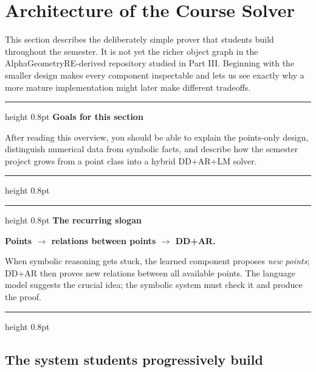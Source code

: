 \documentclass[reqno]{amsart}
\newenvironment{lecturebox}[1]{%
    \par\medskip
    \noindent\begingroup
    \setlength{\parindent}{0pt}
    \color{agblue}\hrule height 0.8pt\color{black}
    \smallskip
    \textbf{\color{agblue}#1}\par\smallskip
}{%
    \smallskip
    \color{agblue}\hrule height 0.8pt\color{black}
    \endgroup
    \medskip
}
\DeclareMathOperator{\1}{\textbf{1}}
\begin{document}
\section{Architecture of the Course Solver}
\label{sec: Architecture Course Solver}
This section describes the deliberately simple prover that students build
throughout the semester. It is not yet the richer object graph in the
AlphaGeometryRE-derived repository studied in Part III. Beginning with the
smaller design makes every component inspectable and lets us see exactly why a
more mature implementation might later make different tradeoffs.

\begin{lecturebox}{Goals for this section}
After reading this overview, you should be able to explain the points-only
design, distinguish numerical data from symbolic facts, and describe how the
semester project grows from a point class into a hybrid DD+AR+LM solver.
\end{lecturebox}

\begin{lecturebox}{The recurring slogan}
\begin{center}
\textbf{Points $\longrightarrow$ relations between points
$\longrightarrow$ DD+AR.}
\end{center}
When symbolic reasoning gets stuck, the learned component proposes
\emph{new points}; DD+AR then proves new relations between all available
points. The language model suggests the crucial idea; the symbolic system
must check it and produce the proof.
\end{lecturebox}

\subsection*{The system students progressively build}
\end{document}
